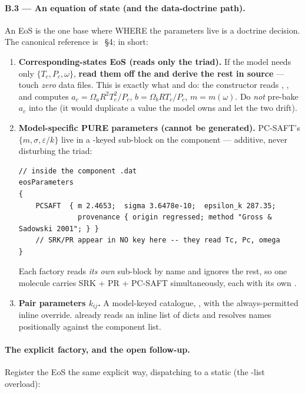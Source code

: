 \documentclass[11pt,a4paper]{article}
\begin{document}
\paragraph{B.3 --- An equation of state (and the data-doctrine path).}  An EoS
is the one base where WHERE the parameters live is a doctrine decision.  The
canonical reference is ~\S4; in short:

\begin{enumerate}[leftmargin=*]
  \item \textbf{Corresponding-states EoS (reads only the triad).}  If the model
        needs only \(\{T_c, P_c, \omega\}\), \textbf{read them off the
         and derive the rest in source} --- touch \emph{zero}
        data files.  This is exactly what  and  do: the
         constructor reads , ,
         and computes \(a_c = \Omega_a R^2 T_c^2 / P_c\),
        \(b = \Omega_b R T_c / P_c\), \(m = m(\omega)\).  Do \emph{not}
        pre-bake \(a_c\) into the  (it would duplicate a value the
        model owns and let the two drift).
  \item \textbf{Model-specific PURE parameters (cannot be generated).}  PC-SAFT's
        \(\{m, \sigma, \varepsilon/k\}\) live in a -keyed sub-block
        on the component --- additive, never disturbing the triad:
\begin{lstlisting}[language=dict]
// inside the component .dat
eosParameters
{
    PCSAFT  { m 2.4653;  sigma 3.6478e-10;  epsilon_k 287.35;
              provenance { origin regressed; method "Gross & Sadowski 2001"; } }
    // SRK/PR appear in NO key here -- they read Tc, Pc, omega
}
\end{lstlisting}
        Each factory reads \emph{its own}  sub-block
        by name and ignores the rest, so one molecule carries SRK + PR +
        PC-SAFT simultaneously, each with its own .
  \item \textbf{Pair parameters \(k_{ij}\).}  A model-keyed catalogue,
        , with
        the always-permitted inline override.   already
        reads an inline  list of
         dicts and resolves names positionally against
        the component list.
\end{enumerate}

\paragraph{The explicit factory, and the open follow-up.}  Register the EoS the
same explicit way, dispatching to a  static (the
-list overload):
\end{document}
